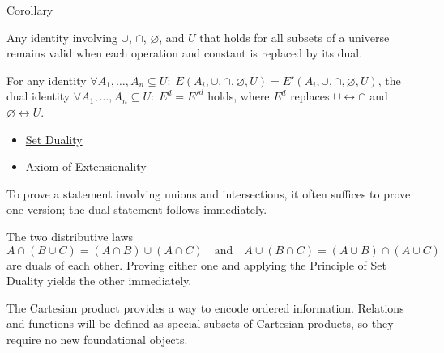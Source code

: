 \begin{corollarybox}{Corollary}
\begin{corollary}\label{cor:set-duality}
Any identity involving $\cup$, $\cap$, $\varnothing$, and $U$ that holds for
all subsets of a universe remains valid when each operation and constant is
replaced by its dual.
\end{corollary}
\end{corollarybox}

\begin{remark*}
For any identity $\forall A_1,\dots,A_n \subseteq U:\; E(A_i,\cup,\cap,\varnothing,U) = E'(A_i,\cup,\cap,\varnothing,U)$, the dual identity $\forall A_1,\dots,A_n \subseteq U:\; E^d = E'^d$ holds, where $E^d$ replaces $\cup\leftrightarrow\cap$ and $\varnothing\leftrightarrow U$.
\end{remark*}

\begin{dependencies}
\begin{itemize}
  \item \hyperref[def:set-duality]{Set Duality}
  \item \hyperref[ax:extensionality]{Axiom of Extensionality}
\end{itemize}
\end{dependencies}

\begin{remark*}
To prove a statement involving unions and intersections, it often suffices to
prove one version; the dual statement follows immediately.
\end{remark*}

\begin{example*}
The two distributive laws
\[
A \cap (B \cup C) = (A \cap B) \cup (A \cap C)
\quad\text{and}\quad
A \cup (B \cap C) = (A \cup B) \cap (A \cup C)
\]
are duals of each other. Proving either one and applying the Principle of Set
Duality yields the other immediately.
\end{example*}

\begin{remark*}
The Cartesian product provides a way to encode ordered information.
Relations and functions will be defined as special subsets of Cartesian
products, so they require no new foundational objects.
\end{remark*}
